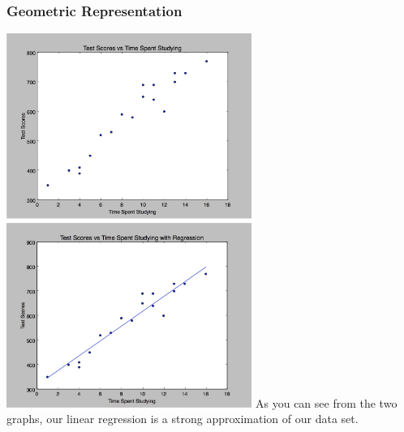 \documentclass[12pt]{article}
\begin{document}
\subsubsection{Geometric Representation}
\includegraphics[width=80mm]{img/scatter_plots}
\includegraphics[width=80mm]{img/regression}
As you can see from the two graphs, our linear regression is a strong approximation of our data set. 
\end{document}
